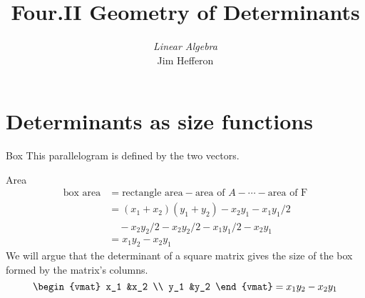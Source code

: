 \documentclass[10pt,t]{beamer}
\title[Geometry of Determinants] %
{Four.II Geometry of Determinants}
\author{\textit{Linear Algebra} \\ {\small Jim Hef{}feron}}
\institute{
  \texttt{http://joshua.smcvt.edu/linearalgebra}
}
\date{}
\begin{document}
\begin{frame}
  \titlepage
\end{frame}




\section{Determinants as size functions}
\begin{frame}{Box}
This parallelogram is defined by the two vectors.

\df[df:Box]

\end{frame}
\begin{frame}{Area}
\begin{align*}
  \text{box area}
  &=\text{rectangle area}-\text{area of $A$}-\cdots-\text{area of F} \\
  &=(x_1+x_2)(y_1+y_2)-x_2y_1-x_1y_1/2        \\
    &\quad-x_2y_2/2-x_2y_2/2-x_1y_1/2-x_2y_1         \\
  &=x_1y_2-x_2y_1        
\end{align*}
We will argue that
the determinant of a square matrix   
gives the size of the box formed by the matrix's columns.  
\begin{equation*}
  \begin{vmat}
    x_1  &x_2  \\
    y_1  &y_2
  \end{vmat}
  =x_1y_2-x_2y_1
\end{equation*}
\end{frame}
\end{document}
